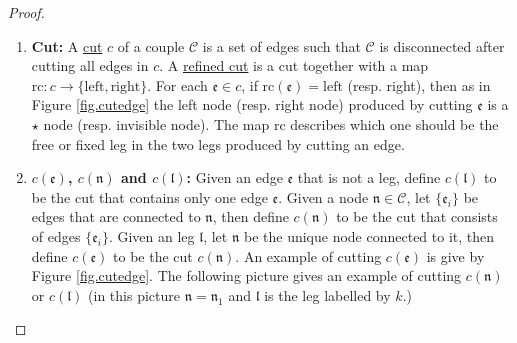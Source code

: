 \begin{proof}
\begin{defn}
\begin{enumerate}
    \item \textbf{Cut:} A \underline{cut} $c$ of a couple $\mathcal{C}$ is a set of edges such that $\mathcal{C}$ is disconnected after cutting all edges in $c$. A \underline{refined cut} is a cut together with a map $\text{rc}:c\rightarrow \{\text{left}, \text{right}\}$. For each $\mathfrak{e}\in c$, if $\text{rc}(\mathfrak{e})=\text{left}$ (resp. right), then as in Figure \ref{fig.cutedge} the left node (resp. right node) produced by cutting $\mathfrak{e}$ is a $\star$ node (resp. invisible node). The map $\text{rc}$ describes which one should be the free or fixed leg in the two legs produced by cutting an edge.
    \item \textbf{$c(\mathfrak{e})$, $c(\mathfrak{n})$ and $c(\mathfrak{l})$:} Given an edge $\mathfrak{e}$ that is not a leg, define  $c(\mathfrak{l})$ to be the cut that contains only one edge $\mathfrak{e}$. Given a node $\mathfrak{n}\in \mathcal{C}$, let $\{\mathfrak{e}_{i}\}$ be edges that are connected to $\mathfrak{n}$, then define $c(\mathfrak{n})$ to be the cut that consists of edges $\{\mathfrak{e}_{i}\}$. Given an leg $\mathfrak{l}$, let $\mathfrak{n}$ be the unique node connected to it, then define  $c(\mathfrak{e})$ to be the cut $c(\mathfrak{n})$. An example of cutting $c(\mathfrak{e})$ is give by Figure \ref{fig.cutedge}. The following picture gives an example of cutting $c(\mathfrak{n})$ or $c(\mathfrak{l})$ (in this picture $\mathfrak{n}=\mathfrak{n}_1$ and $\mathfrak{l}$ is the leg labelled by $k$.)
    
    \begin{figure}[H]
    \centering
\end{figure}
\end{enumerate}
\end{defn}
\end{proof}
